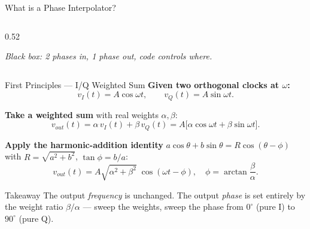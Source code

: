 \documentclass[10pt, aspectratio=169]{beamer}
\begin{document}
\begin{frame}{What is a Phase Interpolator?}
\begin{columns}[T]
\begin{column}{0.52\linewidth}
{}

      \vspace{4mm}
      \small\emph{Black box: 2 phases in, 1 phase out, code controls where.}
    \end{column}
  \end{columns}
\end{frame}

\begin{frame}{First Principles — I/Q Weighted Sum}
  \textbf{Given two orthogonal clocks at $\omega$:}
  \[
    v_I(t) = A\cos\omega t,\qquad
    v_Q(t) = A\sin\omega t.
  \]

  \textbf{Take a weighted sum} with real weights $\alpha, \beta$:
  \[
    v_{out}(t) = \alpha\,v_I(t) + \beta\,v_Q(t)
               = A\bigl[\alpha\cos\omega t + \beta\sin\omega t\bigr].
  \]

  \textbf{Apply the harmonic-addition identity}
  $a\cos\theta + b\sin\theta = R\cos(\theta-\phi)$ with
  $R=\sqrt{a^2+b^2}$, $\tan\phi = b/a$:
  \[
    \boxed{\;
      v_{out}(t)
        = A\sqrt{\alpha^2+\beta^2}\;
          \cos\!\left(\omega t - \phi\right),
      \quad
      \phi = \arctan\!\frac{\beta}{\alpha}.
    \;}
  \]

  \begin{block}{Takeaway}
    The output \emph{frequency} is unchanged. The output \emph{phase}
    is set entirely by the weight ratio $\beta/\alpha$ — sweep the
    weights, sweep the phase from $0^\circ$ (pure I) to $90^\circ$
    (pure Q).
  \end{block}
\end{frame}
\end{document}
